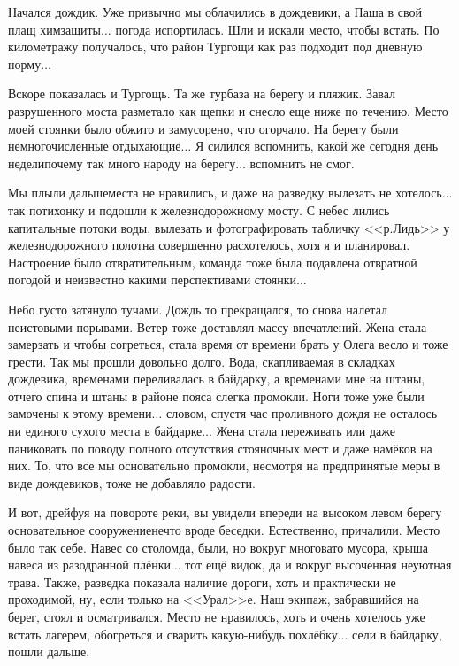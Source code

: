 Начался дождик. Уже привычно мы облачились в дождевики, а Паша в свой плащ химзащиты$\ldots$ погода испортилась. Шли и искали место, чтобы встать. По километражу получалось, что район Тургощи как раз подходит под дневную норму$\ldots$

Вскоре показалась и Тургощь. Та же турбаза на берегу и пляжик. Завал разрушенного моста разметало как щепки и снесло еще ниже по течению. Место моей стоянки было обжито и замусорено, что огорчало. На берегу были немногочисленные отдыхающие$\ldots$ Я силился вспомнить, какой же сегодня день недели\mdash почему так много народу на берегу$\ldots$ вспомнить не смог. 

Мы плыли дальше\mdash места не нравились, и даже на разведку вылезать не хотелось$\ldots$ так потихонку и подошли к железнодорожному мосту. С небес лились капитальные потоки воды, вылезать и фотографировать табличку <<р.\thinspace Лидь>> у железнодорожного полотна совершенно расхотелось, хотя я и планировал. Настроение было отвратительным, команда тоже была подавлена отвратной погодой и неизвестно какими перспективами стоянки$\ldots$

Небо густо затянуло тучами. Дождь то прекращался, то снова налетал неистовыми порывами. Ветер тоже доставлял массу впечатлений. Жена стала замерзать и чтобы согреться, стала время от времени брать у Олега весло и тоже грести. Так мы прошли довольно долго. Вода, скапливаемая в складках дождевика, временами переливалась в байдарку, а временами мне на штаны, отчего спина и штаны в районе пояса слегка промокли. Ноги тоже уже были замочены к этому времени$\ldots$ словом, спустя час проливного дождя не осталось ни единого сухого места в байдарке$\ldots$ Жена стала переживать или даже паниковать по поводу полного отсутствия стояночных мест и даже намёков на них. То, что все мы основательно промокли, несмотря на предпринятые меры в виде дождевиков, тоже не добавляло радости.

И вот, дрейфуя на повороте реки, вы увидели впереди на высоком левом берегу основательное сооружение\mdash нечто вроде беседки. Естественно, причалили. Место было так себе. Навес со столом\mdash да, были, но вокруг многовато мусора, крыша навеса из разодранной плёнки$\ldots$ тот ещё видок, да и вокруг высоченная неуютная трава. Также, разведка показала наличие дороги, хоть и практически не проходимой, ну, если только на <<Урал>>\sdash е. Наш экипаж, забравшийся на берег, стоял и осматривался. Место не нравилось, хоть и очень хотелось уже встать лагерем, обогреться и сварить какую-нибудь похлёбку$\ldots$ сели в байдарку, пошли дальше.

